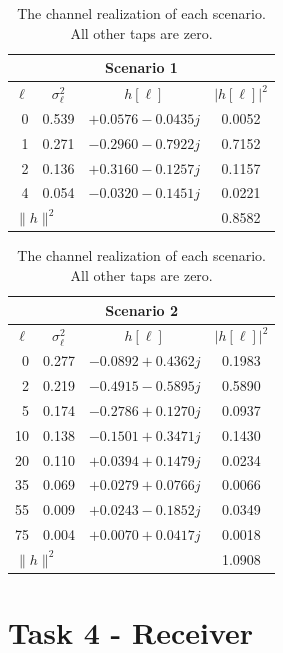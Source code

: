 \documentclass[11pt,a4paper]{article}
\begin{document}
\begin{table}[!htb]
  \centering
  \caption{The channel realization of each scenario. All other taps are zero.}
  \label{tab:taps}
  \small
  \begin{tabular}[t]{rccc}
    \multicolumn{4}{c}{Scenario 1} \\
    \toprule
    $\ell$ & $\sigma_\ell^2$ & $h[\ell]$ & $|h[\ell]|^2$ \\
    \midrule
    0 & 0.539 & $+0.0576 - 0.0435j$ & 0.0052 \\
    1 & 0.271 & $-0.2960 - 0.7922j$ & 0.7152 \\
    2 & 0.136 & $+0.3160 - 0.1257j$ & 0.1157 \\
    4 & 0.054 & $-0.0320 - 0.1451j$ & 0.0221 \\
    \midrule
    \multicolumn{3}{l}{$\|h\|^2$} & 0.8582 \\
    \bottomrule
  \end{tabular}
  \qquad
  \begin{tabular}[t]{rccc}
    \multicolumn{4}{c}{Scenario 2} \\
    \toprule
    $\ell$ & $\sigma_\ell^2$ & $h[\ell]$ & $|h[\ell]|^2$ \\
    \midrule
     0 & 0.277 & $-0.0892 + 0.4362j$ & 0.1983 \\
     2 & 0.219 & $-0.4915 - 0.5895j$ & 0.5890 \\
     5 & 0.174 & $-0.2786 + 0.1270j$ & 0.0937 \\
    10 & 0.138 & $-0.1501 + 0.3471j$ & 0.1430 \\
    20 & 0.110 & $+0.0394 + 0.1479j$ & 0.0234 \\
    35 & 0.069 & $+0.0279 + 0.0766j$ & 0.0066 \\
    55 & 0.009 & $+0.0243 - 0.1852j$ & 0.0349 \\
    75 & 0.004 & $+0.0070 + 0.0417j$ & 0.0018 \\
    \midrule
    \multicolumn{3}{l}{$\|h\|^2$} & 1.0908 \\
    \bottomrule
  \end{tabular}
\end{table}

\section{Task 4 - Receiver}
\end{document}
